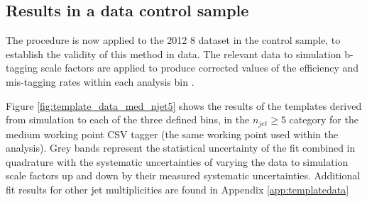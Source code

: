 \FloatBarrier
\subsection{Results in a data control sample}
\label{subsec:templatedataresults}

The procedure is now applied to the 2012 8 \TeV dataset in the \mupjets control sample, to establish the validity of this method in data. The relevant data to simulation b-tagging scale factors are applied to produce corrected values of the efficiency and mis-tagging rates within each analysis bin \cite{btagscalefactor}. 

Figure \ref{fig:template_data_med_njet5} shows the results of the templates derived from simulation to each of the three defined \theht bins, in the $n_{jet} \geq 5$ category for the medium working point \ac{CSV} tagger (the same working point used within the \alphat analysis).  Grey bands represent the statistical uncertainty of the fit combined in quadrature with the systematic uncertainties of varying the data to simulation scale factors up and down by their measured systematic uncertainties.  Additional fit results for other jet multiplicities are found in Appendix \ref{app:templatedata}  

